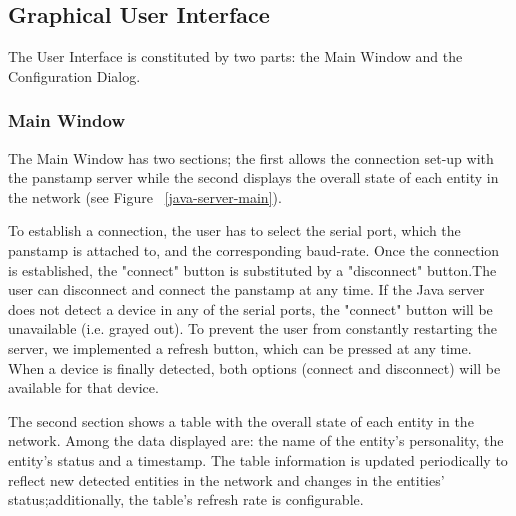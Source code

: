\subsection{Graphical User Interface}


The User Interface is constituted by two parts: the Main Window and the Configuration Dialog.

\subsubsection{Main Window}

The Main Window has two sections; the first allows the connection set-up with the panstamp server while the second displays the overall state of each entity in the network (see Figure ~\ref{java-server-main}). 

To establish a connection, the user has to select the serial port, which the panstamp is attached to, and the corresponding baud-rate. Once the connection is established, the "connect" button is substituted by a "disconnect" button.The user can disconnect and connect the panstamp at any time. 
If the Java server does not detect a device in any of the serial ports, the "connect" button will be unavailable (i.e. grayed out). To prevent the user from constantly restarting the server, we implemented a refresh button, which can be pressed at any time. When a device is finally detected, both options (connect and disconnect) will be available for that device.

The second section shows a table with the overall state of each entity in the network.
Among the data displayed are: the name of the entity's personality, the entity's status and a timestamp.
The table information is updated periodically to reflect new detected entities in the network and changes in 
the entities' status;additionally, the table's refresh rate is configurable.  

